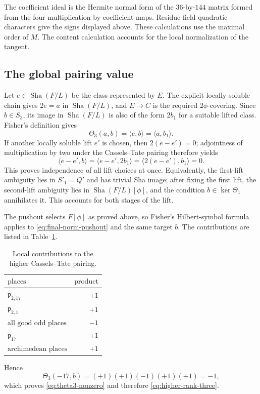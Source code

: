 \documentclass[11pt,a4paper]{article}
\theoremstyle{definition}\newtheorem{definition}[theorem]{Definition}
\theoremstyle{remark}\newtheorem{remark}[theorem]{Remark}
\begin{document}
The coefficient ideal is the Hermite normal form of the $36$-by-$144$ matrix formed from the four multiplication-by-coefficient maps. Residue-field quadratic characters give the signs displayed above. These calculations use the maximal order of $M$.
The content calculation accounts for the local normalization of the tangent.

\subsection{The global pairing value}

Let $e\in\operatorname{Sha}(F/L)$ be the class represented by $E$.  The explicit
locally soluble chain gives $2e=a$ in $\operatorname{Sha}(F/L)$, and $E\longrightarrow C$
is the required $2\phi$-covering.  Since $b\in S_3$, its image in
$\operatorname{Sha}(F/L)$ is also of the form $2b_1$ for a suitable lifted class.
Fisher's definition gives
\[
 \Theta_3(a,b)=\langle e,b\rangle
             =\langle a,b_1\rangle.
\]
If another locally soluble lift $e'$ is chosen, then $2(e-e')=0$;
adjointness of multiplication by two under the Cassels--Tate pairing
therefore yields
\[
 \langle e-e',b\rangle
 =\langle e-e',2b_1\rangle
 =\langle2(e-e'),b_1\rangle=0.
\]
This proves independence of all lift choices at once.  Equivalently,
the first-lift ambiguity lies in $S'_1=Q'$ and has trivial Sha image;
after fixing the first lift, the second-lift ambiguity lies in
$\operatorname{Sha}(F/L)[\phi]$, and the condition $b\in\ker\Theta_1$ annihilates it.
This accounts for both stages of the lift.

The pushout selects $F[\phi]$ as proved above, so Fisher's Hilbert-symbol
formula applies to \eqref{eq:final-norm-pushout} and the same target $b$.
The contributions are listed in Table~\ref{tab:8}.
\begin{table}[htbp]
\centering
\caption{Local contributions to the higher Cassels--Tate pairing.}\label{tab:8}
\begin{tabular}{lr}
\toprule
$\text{places}$ & $\text{product}$\\
\midrule
$\mathfrak p_{2,17}$ & $+1$\\
$\mathfrak p_{2,1}$ & $+1$\\
$\text{all good odd places}$ & $-1$\\
$\mathfrak p_{17}$ & $+1$\\
$\text{archimedean places}$ & $+1$\\
\bottomrule
\end{tabular}
\end{table}
Hence
\[
 \Theta_3(-17,b)=(+1)(+1)(-1)(+1)(+1)=-1,
\]
which proves \eqref{eq:theta3-nonzero} and therefore
\eqref{eq:higher-rank-three}.
\end{document}
